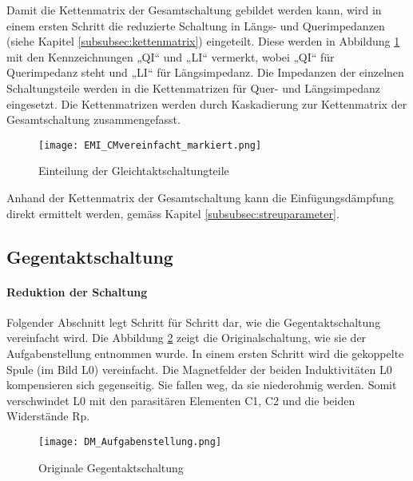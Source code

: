 Damit die Kettenmatrix der Gesamtschaltung gebildet werden kann, wird in einem ersten Schritt die reduzierte Schaltung in Längs- und Querimpedanzen (siehe Kapitel \ref{subsubsec:kettenmatrix}) eingeteilt. Diese werden in Abbildung \ref{fig:cmschaltungEingeteilt} mit den Kennzeichnungen „QI“ und „LI“ vermerkt, wobei „QI“ für Querimpedanz steht und „LI“ für Längsimpedanz. Die Impedanzen der einzelnen Schaltungsteile werden in die Kettenmatrizen für Quer- und Längsimpedanz eingesetzt. Die Kettenmatrizen werden durch Kaskadierung zur Kettenmatrix der Gesamtschaltung zusammengefasst.

\begin{figure}[H]
		\centering
		\texttt{[image: EMI\_CMvereinfacht\_markiert.png]}
		\caption{Einteilung der Gleichtaktschaltungteile}
		\label{fig:cmschaltungEingeteilt}
\end{figure}

Anhand der Kettenmatrix der Gesamtschaltung kann die Einfügungsdämpfung direkt ermittelt werden, gemäss Kapitel \ref{subsubsec:streuparameter}. 

\bigskip

\subsection{Gegentaktschaltung}\label{subsec:zusammenfassungGegentakt}

\paragraph{Reduktion der Schaltung}\label{para:redukGegentakt}

Folgender Abschnitt legt Schritt für Schritt dar, wie die Gegentaktschaltung vereinfacht wird. Die Abbildung \ref{fig:DMSchaltungAufgabenstellung} zeigt die Originalschaltung, wie sie der Aufgabenstellung entnommen wurde. In einem ersten Schritt wird die gekoppelte Spule (im Bild L0) vereinfacht. Die Magnetfelder der beiden Induktivitäten L0 kompensieren sich gegenseitig. Sie fallen weg, da sie niederohmig werden. Somit verschwindet L0 mit den parasitären Elementen C1, C2 und die beiden Widerstände Rp.

\begin{figure}[H]
	\centering
	\texttt{[image: DM\_Aufgabenstellung.png]}
	\caption{Originale Gegentaktschaltung}
	\label{fig:DMSchaltungAufgabenstellung}
\end{figure}

\newpage

